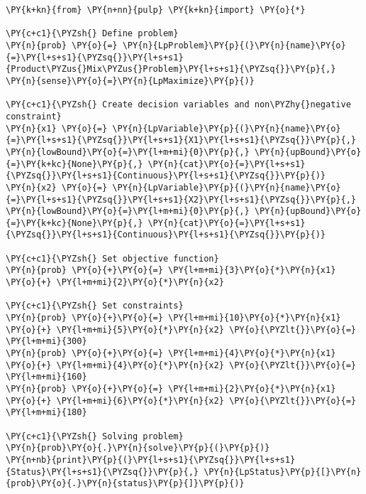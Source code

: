     \begin{tcolorbox}[breakable, size=fbox, boxrule=1pt, pad at break*=1mm,colback=cellbackground, colframe=cellborder]
\begin{Verbatim}[commandchars=\\\{\}]
\PY{k+kn}{from} \PY{n+nn}{pulp} \PY{k+kn}{import} \PY{o}{*}

\PY{c+c1}{\PYZsh{} Define problem}
\PY{n}{prob} \PY{o}{=} \PY{n}{LpProblem}\PY{p}{(}\PY{n}{name}\PY{o}{=}\PY{l+s+s1}{\PYZsq{}}\PY{l+s+s1}{Product\PYZus{}Mix\PYZus{}Problem}\PY{l+s+s1}{\PYZsq{}}\PY{p}{,} \PY{n}{sense}\PY{o}{=}\PY{n}{LpMaximize}\PY{p}{)}

\PY{c+c1}{\PYZsh{} Create decision variables and non\PYZhy{}negative constraint}
\PY{n}{x1} \PY{o}{=} \PY{n}{LpVariable}\PY{p}{(}\PY{n}{name}\PY{o}{=}\PY{l+s+s1}{\PYZsq{}}\PY{l+s+s1}{X1}\PY{l+s+s1}{\PYZsq{}}\PY{p}{,} \PY{n}{lowBound}\PY{o}{=}\PY{l+m+mi}{0}\PY{p}{,} \PY{n}{upBound}\PY{o}{=}\PY{k+kc}{None}\PY{p}{,} \PY{n}{cat}\PY{o}{=}\PY{l+s+s1}{\PYZsq{}}\PY{l+s+s1}{Continuous}\PY{l+s+s1}{\PYZsq{}}\PY{p}{)}
\PY{n}{x2} \PY{o}{=} \PY{n}{LpVariable}\PY{p}{(}\PY{n}{name}\PY{o}{=}\PY{l+s+s1}{\PYZsq{}}\PY{l+s+s1}{X2}\PY{l+s+s1}{\PYZsq{}}\PY{p}{,} \PY{n}{lowBound}\PY{o}{=}\PY{l+m+mi}{0}\PY{p}{,} \PY{n}{upBound}\PY{o}{=}\PY{k+kc}{None}\PY{p}{,} \PY{n}{cat}\PY{o}{=}\PY{l+s+s1}{\PYZsq{}}\PY{l+s+s1}{Continuous}\PY{l+s+s1}{\PYZsq{}}\PY{p}{)}

\PY{c+c1}{\PYZsh{} Set objective function}
\PY{n}{prob} \PY{o}{+}\PY{o}{=} \PY{l+m+mi}{3}\PY{o}{*}\PY{n}{x1} \PY{o}{+} \PY{l+m+mi}{2}\PY{o}{*}\PY{n}{x2}

\PY{c+c1}{\PYZsh{} Set constraints}
\PY{n}{prob} \PY{o}{+}\PY{o}{=} \PY{l+m+mi}{10}\PY{o}{*}\PY{n}{x1} \PY{o}{+} \PY{l+m+mi}{5}\PY{o}{*}\PY{n}{x2} \PY{o}{\PYZlt{}}\PY{o}{=} \PY{l+m+mi}{300}
\PY{n}{prob} \PY{o}{+}\PY{o}{=} \PY{l+m+mi}{4}\PY{o}{*}\PY{n}{x1} \PY{o}{+} \PY{l+m+mi}{4}\PY{o}{*}\PY{n}{x2} \PY{o}{\PYZlt{}}\PY{o}{=} \PY{l+m+mi}{160}
\PY{n}{prob} \PY{o}{+}\PY{o}{=} \PY{l+m+mi}{2}\PY{o}{*}\PY{n}{x1} \PY{o}{+} \PY{l+m+mi}{6}\PY{o}{*}\PY{n}{x2} \PY{o}{\PYZlt{}}\PY{o}{=} \PY{l+m+mi}{180}

\PY{c+c1}{\PYZsh{} Solving problem}
\PY{n}{prob}\PY{o}{.}\PY{n}{solve}\PY{p}{(}\PY{p}{)}
\PY{n+nb}{print}\PY{p}{(}\PY{l+s+s1}{\PYZsq{}}\PY{l+s+s1}{Status}\PY{l+s+s1}{\PYZsq{}}\PY{p}{,} \PY{n}{LpStatus}\PY{p}{[}\PY{n}{prob}\PY{o}{.}\PY{n}{status}\PY{p}{]}\PY{p}{)}
\end{Verbatim}
\end{tcolorbox}

